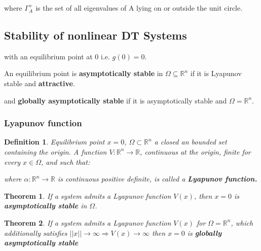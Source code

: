 \documentclass[8pt,a4paper]{scrartcl}
\newtheorem{define}{Definition}
\newtheorem{theorem}{Theorem}
\begin{document}
\begin{multicols*}{3}
where $\Gamma_A^+$ is the set of all eigenvalues of A lying on or outside the unit circle.

\subsection{Stability of nonlinear DT Systems}


with an equilibrium point at $0$ i.e. $g(0)=0$.


An equilibrium point is \textbf{asymptotically stable} in $\Omega\subseteq\mathbb{R}^n$ if it is Lyapunov stable and \textbf{attractive}.


and \textbf{globally asymptotically stable} if it is asymptotically stable and $\Omega=\mathbb{R}^n$.

\subsubsection{Lyapunov function}

\begin{define}
Equilibrium point $x=0$, $\Omega\subset\mathbb{R}^n$ a closed an bounded set containing the origin. A function $V:\mathbb{R}^n\rightarrow\mathbb{R}$, continuous at the origin, finite for every $x\in\Omega$, and such that:


where $\alpha:\mathbb{R}^n\rightarrow\mathbb{R}$ is continuous positive definite, is called a \textbf{Lyapunov function.}
\end{define}

\begin{theorem}If a system admits a Lyapunov function $V(x)$, then $x=0$ is \textbf{asymptotically stable} in $\Omega$.
\end{theorem}

\begin{theorem}If a system admits a Lyapunov function $V(x)$ for $\Omega=\mathbb{R}^n$, which additionally satisfies $||x||\rightarrow\infty\Rightarrow V(x)\rightarrow\infty$ then $x=0$ is \textbf{globally asymptotically stable}
\end{theorem}


\end{multicols*}
\end{document}
